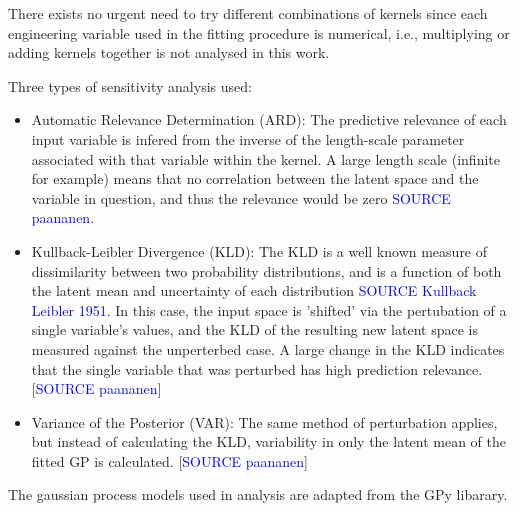 \documentclass[a4paper, twoside, final, 12pt]{article}
\begin{document}
There exists no urgent need to try different combinations of kernels since each engineering variable used in the fitting procedure is numerical, i.e., multiplying or adding kernels together is not analysed in this work.

Three types of sensitivity analysis used:
\begin{itemize}
	\item Automatic Relevance Determination (ARD): The predictive relevance of each input variable is infered from the inverse of the length-scale parameter associated with that variable within the kernel. A large length scale (infinite for example) means that no correlation between the latent space and the variable in question, and thus the relevance would be zero \textcolor{blue}{SOURCE paananen}. 
	\item Kullback-Leibler Divergence (KLD): The KLD is a well known measure of dissimilarity between two probability distributions, and is a function of both the latent mean and uncertainty of each distribution \textcolor{blue}{SOURCE Kullback Leibler 1951}. In this case, the input space is 'shifted' via the pertubation of a single variable's values, and the KLD of the resulting new latent space is measured against the unperterbed case. A large change in the KLD indicates that the single variable that was perturbed has high prediction relevance.  [\textcolor{blue}{SOURCE paananen}]
	\item Variance of the Posterior (VAR): The same method of perturbation applies, but instead of calculating the KLD, variability in  only the latent mean of the fitted GP is calculated. [\textcolor{blue}{SOURCE paananen}]
\end{itemize}

The gaussian process models used in analysis are adapted from the GPy libarary. 
\end{document}
